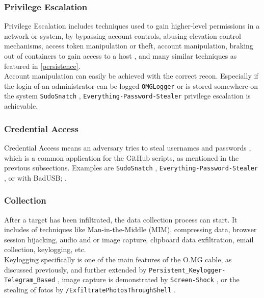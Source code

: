 \subsubsection{Privilege Escalation}

Privilege Escalation includes techniques used to gain higher-level permissions in a network or system, by bypassing account controls, abusing elevation control mechanisms, access token manipulation or theft, account manipulation, braking out of containers to gain access to a host \cite{MITREATTCK}, and many similar techniques as featured in \ref{persistence}. \\
Account manipulation can easily be achieved with the correct recon. Especially if the login of an administrator can be logged \verb|OMGLogger| \cite{OmgpayloadsPayloadsLibrary} or is stored somewhere on the system \verb|SudoSnatch| \cite{OmgpayloadsPayloadsLibrary}, \verb|Everything-Password-Stealer| \cite{OmgpayloadsPayloadsLibrary} privilege escalation is achievable.

\subsubsection{Credential Access}

Credential Access means an adversary tries to steal usernames and passwords \cite{MITREATTCK}, which is a common application for the GitHub scripts, as mentioned in the previous subsections. Examples are \verb|SudoSnatch| \cite{OmgpayloadsPayloadsLibrary}, \verb|Everything-Password-Stealer| \cite{OmgpayloadsPayloadsLibrary}, or with BadUSB;  \cite{muslimImplementationAnalysisUSB2020}. 


\subsubsection{Collection}
After a target has been infiltrated, the data collection process can start. It includes of techniques like Man-in-the-Middle (MIM), compressing data, browser session hijacking, audio and or image capture, clipboard data exfiltration, email collection, keylogging, etc. \cite{MITREATTCK} \\
Keylogging specifically is one of the main features of the O.MG cable, as discussed previously, and further extended by \verb|Persistent_Keylogger-Telegram_Based|  \cite{OmgpayloadsPayloadsLibrary}, image capture is demonstrated by \verb|Screen-Shock| \cite{OmgpayloadsPayloadsLibrary}, or the stealing of fotos by \verb|/ExfiltratePhotosThroughShell| \cite{OmgpayloadsPayloadsLibrary}. 


